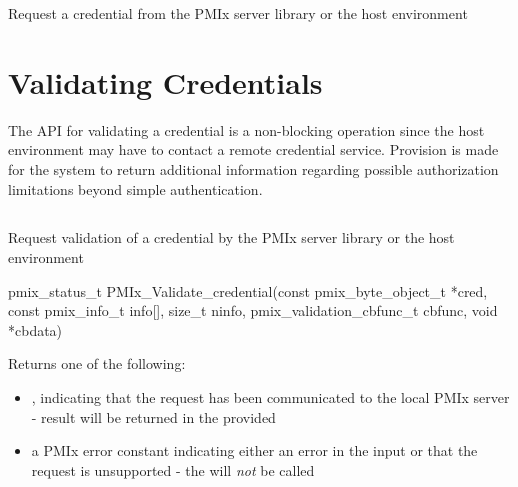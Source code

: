 \descr

Request a credential from the \ac{PMIx} server library or the host environment

\section{Validating Credentials}
\label{chap:api_security:validate}

The \ac{API} for validating a credential is a non-blocking operation since the host environment may have to contact a remote credential service. Provision is made for the system to return additional information regarding possible authorization limitations beyond simple authentication.

\subsection{}

\summary

Request validation of a credential by the \ac{PMIx} server library or the host environment

\format

\cspecificstart
\begin{codepar}
pmix_status_t PMIx_Validate_credential(const pmix_byte_object_t *cred,
                             const pmix_info_t info[], size_t ninfo,
                             pmix_validation_cbfunc_t cbfunc, void *cbdata)
\end{codepar}
\cspecificend

\begin{arglist}
\end{arglist}

Returns one of the following:

\begin{itemize}
    \item {}, indicating that the request has been communicated to the local \ac{PMIx} server - result will be returned in the provided 
    \item a \ac{PMIx} error constant indicating either an error in the input or that the request is unsupported - the  will \textit{not} be called
\end{itemize}

